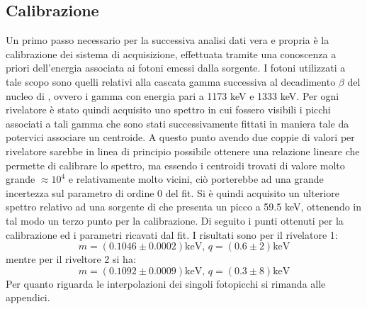 \subsection{Calibrazione}
Un primo passo necessario per la successiva analisi dati vera e propria è la calibrazione dei sistema di acquisizione, effettuata tramite una conoscenza a priori dell'energia
associata ai fotoni emessi dalla sorgente. I fotoni utilizzati a tale scopo sono quelli relativi alla cascata gamma successiva al decadimento $\beta$ del nucleo di , ovvero
i gamma con energia pari a 1173 keV e 1333 keV. Per ogni rivelatore è stato quindi acquisito uno spettro in cui fossero visibili i picchi associati a tali gamma che sono stati
successivamente fittati in maniera tale da potervici associare un centroide. A questo punto avendo due coppie di valori per rivelatore sarebbe in linea di principio possibile
ottenere una relazione lineare che permette di calibrare lo spettro, ma essendo i centroidi trovati di valore molto grande $\approx 10^4$ e relativamente molto vicini, ciò
porterebbe ad una grande incertezza sul parametro di ordine 0 del fit. Si è quindi acquisito un ulteriore spettro relativo ad una sorgente di  
che presenta 
un picco a 59.5 keV, ottenendo in tal modo un terzo punto per la calibrazione. Di seguito i punti ottenuti per la calibrazione ed i parametri ricavati dal fit. I risultati sono
per il rivelatore 1:
$$ m = (0.1046 \pm 0.0002) \text{keV, } q = (0.6 \pm 2) \text{keV}$$
mentre per il riveltore 2 si ha:
$$ m = (0.1092 \pm 0.0009) \text{keV, } q = (0.3 \pm 8) \text{keV}$$
Per quanto riguarda le interpolazioni dei singoli fotopicchi si rimanda alle appendici.



